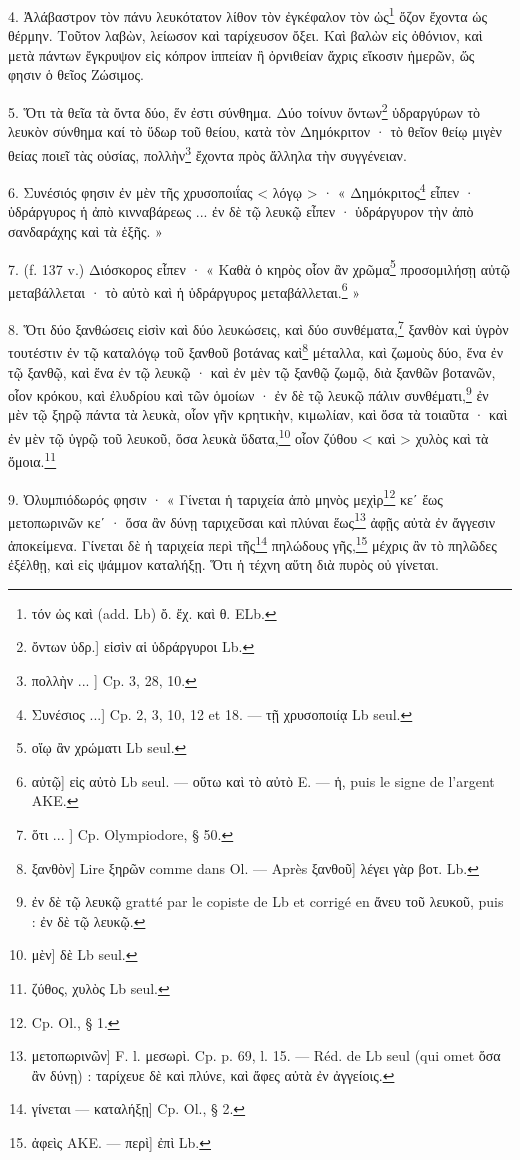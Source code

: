 \documentclass[landscape, a4paper, 11pt, oneside, polutonikogreek, french]{article}
\begin{document}
4. Ἀλάβαστρον τὸν πάνυ λευκότατον λίθον τὸν ἐγκέφαλον τὸν ὡς\footnote{τόν ὡς καὶ (add. Lb) ὄ. ἔχ. καὶ θ. ELb.} ὄζον ἔχοντα ὡς θέρμην. Τοῦτον λαβὼν, λείωσον καὶ ταρίχευσον ὄξει. Καὶ βαλὼν εἰς ὀθόνιον, καὶ μετὰ πάντων ἔγκρυψον εἰς κόπρον ἱππείαν ἢ ὀρνιθείαν ἄχρις εἴκοσιν ἡμερῶν, ὥς φησιν ὁ θεῖος Ζώσιμος.

5. Ὅτι τὰ θεῖα τὰ ὄντα δύο, ἕν ἐστι σύνθημα. Δύο τοίνυν ὄντων\footnote{ὄντων ὑδρ.] εἰσὶν αἱ ὑδράργυροι Lb.} ὑδραργύρων τὸ λευκὸν σύνθημα καί τὸ ὕδωρ τοῦ θείου, κατὰ τὸν Δημόκριτον · τὸ θεῖον θείῳ μιγὲν θείας ποιεῖ τὰς οὐσίας, πολλὴν\footnote{πολλὴν ... ] Cp. 3, 28, 10.} ἔχοντα πρὸς ἄλληλα τὴν συγγένειαν.

6. Συνέσιός φησιν ἐν μὲν τῆς χρυσοποιΐας < λόγῳ > · « Δημόκριτος\footnote{Συνέσιος ...] Cp. 2, 3, 10, 12 et 18. --- τῇ χρυσοποιίᾳ Lb seul.} εἶπεν · ὑδράργυρος ἡ ἀπὸ κινναβάρεως ... ἐν δὲ τῷ λευκῷ εἶπεν · ὑδράργυρον τὴν ἀπὸ σανδαράχης καὶ τὰ ἑξῆς. »

7. (f. 137 v.) Διόσκορος εἶπεν · « Καθὰ ὁ κηρὸς οἷον ἂν χρῶμα\footnote{οἵῳ ἂν χρώματι Lb seul.} προσομιλήσῃ αὐτῷ μεταβάλλεται · τὸ αὐτὸ καὶ ἡ ὑδράργυρος μεταβάλλεται.\footnote{αὐτῷ] εἰς αὐτὸ Lb seul. --- οὕτω καὶ τὸ αὐτὸ E. --- ἡ, puis le signe de l'argent AKE.} »

8. Ὅτι δύο ξανθώσεις εἰσὶν καὶ δύο λευκώσεις, καὶ δύο συνθέματα,\footnote{ὅτι ... ] Cp. Olympiodore, § 50.} ξανθὸν καὶ ὑγρὸν τουτέστιν ἐν τῷ καταλόγῳ τοῦ ξανθοῦ βοτάνας καὶ\footnote{ξανθὸν] Lire ξηρῶν comme dans Ol. --- Après ξανθοῦ] λέγει γὰρ βοτ. Lb.} μέταλλα, καὶ ζωμοὺς δύο, ἕνα ἐν τῷ ξανθῷ, καὶ ἕνα ἐν τῷ λευκῷ · καὶ ἐν μὲν τῷ ξανθῷ ζωμῷ, διὰ ξανθῶν βοτανῶν, οἷον κρόκου, καὶ ἐλυδρίου καὶ τῶν ὁμοίων · ἐν δὲ τῷ λευκῷ πάλιν συνθέματι,\footnote{ἐν δὲ τῷ λευκῷ gratté par le copiste de Lb et corrigé en ἄνευ τοῦ λευκοῦ, puis : ἐν δὲ τῷ λευκῷ.} ἐν μὲν τῷ ξηρῷ πάντα τὰ λευκὰ, οἷον γῆν κρητικὴν, κιμωλίαν, καὶ ὅσα τὰ τοιαῦτα · καὶ ἐν μὲν τῷ ὑγρῷ τοῦ λευκοῦ, ὅσα λευκὰ ὕδατα,\footnote{μὲν] δὲ Lb seul.} οἷον ζύθου < καὶ > χυλὸς καὶ τὰ ὅμοια.\footnote{ζύθος, χυλὸς Lb seul.}

9. Ὀλυμπιόδωρός φησιν · « Γίνεται ἡ ταριχεία ἀπὸ μηνὸς μεχὶρ\footnote{Cp. Ol., § 1.} κεʹ ἕως μετοπωρινῶν κεʹ · ὅσα ἂν δύνῃ ταριχεῦσαι καὶ πλύναι ἕως\footnote{μετοπωρινῶν] F. l. μεσωρὶ. Cp. p. 69, l. 15. --- Réd. de Lb seul (qui omet ὅσα ἂν δύνῃ) : ταρίχευε δὲ καὶ πλύνε, καὶ ἄφες αὐτὰ ἐν ἀγγείοις.} ἀφῇς αὐτὰ ἐν ἄγγεσιν ἀποκείμενα. Γίνεται δὲ ἡ ταριχεία περὶ τῆς\footnote{γίνεται --- καταλήξῃ] Cp. Ol., § 2.} πηλώδους γῆς,\footnote{ἀφεὶς AKE. --- περὶ] ἐπὶ Lb.} μέχρις ἂν τὸ πηλῶδες ἐξέλθῃ, καὶ εἰς ψάμμον καταλήξῃ. Ὅτι ἡ τέχνη αὕτη διὰ πυρὸς οὐ γίνεται.
\end{document}
